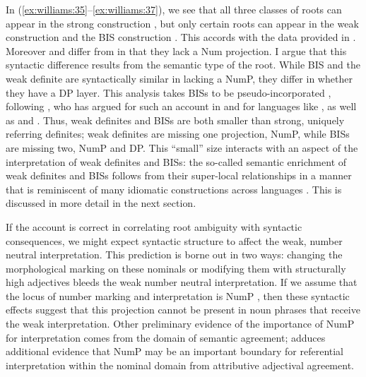 \documentclass[output=paper,
modfonts
]{langscibook}
\begin{document}
In (\ref{ex:williams:35}--\ref{ex:williams:37}), we see that all three classes of roots can appear in the strong construction , but only certain roots can appear in the weak construction  and the BIS construction . This accords with the data provided in . Moreover  and  differ from  in that they lack a Num projection. I argue that this syntactic difference results from the semantic type of the root. While BIS and the weak definite are syntactically similar in lacking a NumP, they differ in whether they have a DP layer. This analysis takes BISs to be pseudo-incorporated , following \citet[9--10]{Carlson2006b}, who has argued for such an account in  and for languages like  \citep{GehrkeLekakou2013}, as well as  and  \citep{massam2001,massam2009}. Thus, weak definites and BISs are both smaller than strong, uniquely referring definites; weak definites are missing one projection, NumP, while BISs are missing two, NumP and DP. This ``small'' size interacts with an aspect of the interpretation of weak definites and BISs: the so-called semantic enrichment of weak definites and BISs follows from their super-local relationships in a manner that is reminiscent of many idiomatic constructions across languages \citep{marantz1995}. This is discussed in more detail in the next section.

If the account is correct in correlating root ambiguity with syntactic consequences, we might expect syntactic structure to affect the weak, number neutral interpretation. This prediction is borne out in two ways: changing the morphological  marking on these nominals or modifying them with structurally high adjectives bleeds the weak number neutral interpretation. If we assume that the locus of number marking and interpretation is NumP \citep{ritter1991,ritter1992,ritter1995}, then these syntactic effects suggest that this projection cannot be present in noun phrases that receive the weak interpretation. Other preliminary evidence of the importance of NumP for interpretation comes from the domain of semantic agreement; \citet{Landau2016} adduces additional evidence that NumP may be an important boundary for referential interpretation within the nominal domain from\largerpage {} attributive adjectival agreement.
\end{document}
